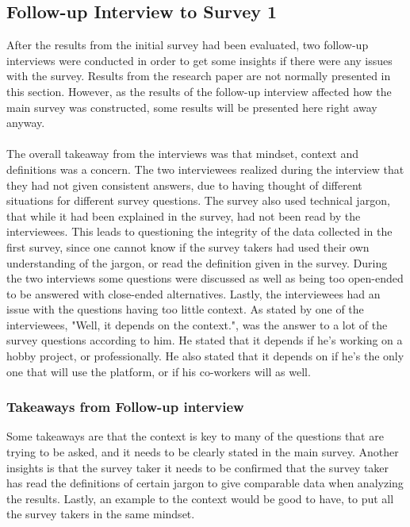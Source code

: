 \documentclass{cslthse-msc}
\begin{document}
    \subsection{Follow-up Interview to Survey 1}

    After the results from the initial survey had been evaluated, two follow-up interviews were
    conducted in order to get some insights if there were any issues with
    the survey. Results from the research paper are not normally presented in this section. However, as the results of the follow-up interview affected how the main survey was constructed, some results will be presented here right away anyway.\\\\
    The overall takeaway from the interviews was that
    mindset, context and definitions was a concern. The two interviewees realized during the interview that they had not given consistent answers, due to having thought of different situations for different survey questions. The survey also used technical jargon, that while it had been explained in the survey, had not been read by the interviewees. This leads to questioning the integrity of the data collected in the first survey, since one cannot know if the survey takers had used their own understanding of the jargon, or read the definition given in the survey. During the two interviews some questions were discussed as well as being too open-ended to be answered with close-ended alternatives. Lastly, the interviewees had an issue with the questions having too little context. As stated by one of the interviewees, "Well, it depends on the context.", was the answer to a lot of the survey questions according to him. He stated that it depends if he's working on a hobby project, or professionally. He also stated that it depends on if he's the only one that will use the platform, or if his co-workers will as well.

    \subsubsection{Takeaways from Follow-up interview}

    Some takeaways are that the context is key to many of the questions that are trying to be asked, and it needs to be clearly stated in the main survey. Another insights is that the survey taker it needs to be confirmed that the survey taker has read the definitions of certain jargon to give comparable data when analyzing the results. Lastly, an example to the context would be good to have, to put all the survey takers in the same mindset.
\end{document}
